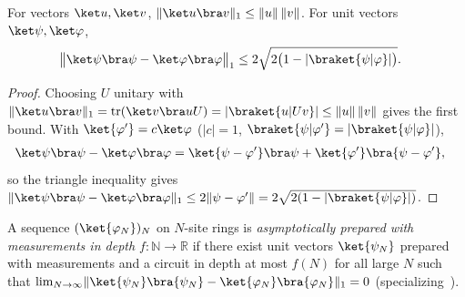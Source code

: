 \begin{lemma}
    \label{lem:qc_pure_state_trace_norm}
    \leanok
    For vectors $\ket u,\ket v$, $\lVert\ket u\bra v\rVert_1\leq\lVert u\rVert\,\lVert v\rVert$. For unit vectors $\ket\psi,\ket\varphi$,
    \begin{align}
        \bigl\lVert\ket\psi\bra\psi-\ket\varphi\bra\varphi\bigr\rVert_1
         & \leq2\sqrt{2\bigl(1-\lvert\braket{\psi|\varphi}\rvert\bigr)}.\notag
    \end{align}
\end{lemma}
\begin{proof}
    \leanok
    Choosing $U$ unitary with $\lVert\ket u\bra v\rVert_1=\operatorname{tr}(\ket v\bra u U)=\lvert\braket{u|Uv}\rvert\leq\lVert u\rVert\,\lVert v\rVert$ gives the first bound. With $\ket{\varphi'}=c\ket\varphi$ ($|c|=1$, $\braket{\psi|\varphi'}=\lvert\braket{\psi|\varphi}\rvert$),
    \begin{align}
        \ket\psi\bra\psi-\ket\varphi\bra\varphi
         & =\ket{\psi-\varphi'}\bra\psi+\ket{\varphi'}\bra{\psi-\varphi'},\notag
    \end{align}
    so the triangle inequality gives $\lVert\ket\psi\bra\psi-\ket\varphi\bra\varphi\rVert_1\le 2\lVert\psi-\varphi'\rVert=2\sqrt{2(1-\lvert\braket{\psi|\varphi}\rvert)}$.
\end{proof}

\begin{definition}
    \label{def:qc_asymptotic_measurement_preparation}
    \leanok
    A sequence $(\ket{\varphi_N})_N$ on $N$-site rings is \emph{asymptotically prepared with measurements in depth $f\colon\mathbb N\to\mathbb R$} if there exist unit vectors $\ket{\psi_N}$ prepared with measurements and a circuit in depth at most $f(N)$ for all large $N$ such that $\lim_{N\to\infty}\lVert\ket{\psi_N}\bra{\psi_N}-\ket{\varphi_N}\bra{\varphi_N}\rVert_1=0$ (specializing~\cite[paragraph ``Phases of matter'']{Piroli2021LOCC}).
\end{definition}

